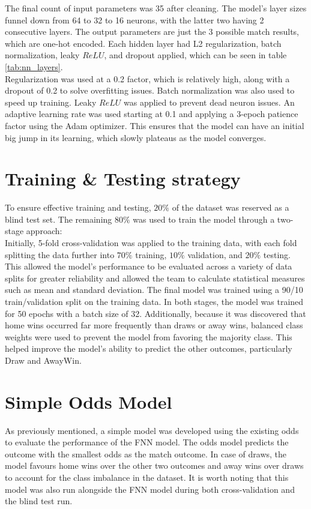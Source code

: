 \documentclass[rgb,listoffigures,listoftables,final]{cam-thesis}
\begin{document}
    The final count of input parameters was 35 after cleaning. The model's layer sizes funnel down from 64 to 32 to 16 neurons, with the latter two having 2 consecutive layers. The output parameters are just the 3 possible match results, which are one-hot encoded. Each hidden layer had L2 regularization, batch normalization, leaky $ReLU$, and dropout applied, which can be seen in table \ref{tab:nn_layers}.\\

    Regularization was used at a 0.2 factor, which is relatively high, along with a dropout of 0.2 to solve overfitting issues. Batch normalization was also used to speed up training. Leaky $ReLU$ was applied to prevent dead neuron issues. An adaptive learning rate was used starting at 0.1 and applying a 3-epoch patience factor using the Adam optimizer. This ensures that the model can have an initial big jump in its learning, which slowly plateaus as the model converges.
    
    \section{Training \& Testing strategy}
    To ensure effective training and testing, $20\%$ of the dataset was reserved as a blind test set. The remaining $80\%$ was used to train the model through a two-stage approach: \\ 
    
    Initially, 5-fold cross-validation was applied to the training data, with each fold splitting the data further into $70\%$ training, $10\%$ validation, and $20\%$ testing. This allowed the model’s performance to be evaluated across a variety of data splits for greater reliability and allowed the team to calculate statistical measures such as mean and standard deviation. The final model was trained using a 90/10 train/validation split on the training data. In both stages, the model was trained for 50 epochs with a batch size of 32. Additionally, because it was discovered that home wins occurred far more frequently than draws or away wins, balanced class weights were used to prevent the model from favoring the majority class. This helped improve the model's ability to predict the other outcomes, particularly Draw and AwayWin.

    \section{Simple Odds Model}
    As previously mentioned, a simple model was developed using the existing odds to evaluate the performance of the FNN model. The odds model predicts the outcome with the smallest odds as the match outcome. In case of draws, the model favours home wins over the other two outcomes and away wins over draws to account for the class imbalance in the dataset. It is worth noting that this model was also run alongside the FNN model during both cross-validation and the blind test run.
    
\end{document}
